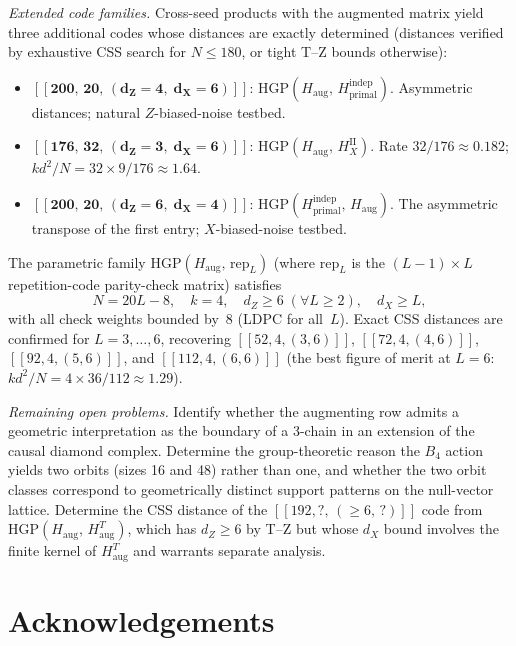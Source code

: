 \documentclass[12pt,a4paper]{article}
\theoremstyle{plain}
\theoremstyle{definition}
\theoremstyle{remark}
\begin{document}
\begin{description}[style=nextline]
\emph{Extended code families.}
Cross-seed products with the augmented matrix yield three additional
codes whose distances are exactly determined (distances verified by
exhaustive CSS search for $N\leq 180$, or tight T--Z bounds otherwise):
\begin{itemize}[noitemsep]
\item $\mathbf{[[200,\,20,\,(d_Z{=}4,\;d_X{=}6)]]}$:
  $\mathrm{HGP}(H_{\mathrm{aug}},\, H_{\mathrm{primal}}^{\mathrm{indep}})$.
  Asymmetric distances; natural $Z$-biased-noise testbed.
\item $\mathbf{[[176,\,32,\,(d_Z{=}3,\;d_X{=}6)]]}$:
  $\mathrm{HGP}(H_{\mathrm{aug}},\, H_X^{\mathrm{II}})$.
  Rate $32/176 \approx 0.182$; $k d^2/N = 32\times 9/176 \approx 1.64$.
\item $\mathbf{[[200,\,20,\,(d_Z{=}6,\;d_X{=}4)]]}$:
  $\mathrm{HGP}(H_{\mathrm{primal}}^{\mathrm{indep}},\, H_{\mathrm{aug}})$.
  The asymmetric transpose of the first entry; $X$-biased-noise testbed.
\end{itemize}
The parametric family $\mathrm{HGP}(H_{\mathrm{aug}},\,\mathrm{rep}_L)$
(where $\mathrm{rep}_L$ is the $(L{-}1)\times L$ repetition-code
parity-check matrix) satisfies
\[
  N = 20L-8, \quad k=4, \quad d_Z \geq 6 \;(\forall L\geq 2),
  \quad d_X \geq L,
\]
with all check weights bounded by~8 (LDPC for all~$L$).
Exact CSS distances are confirmed for $L=3,\ldots,6$, recovering
$[[52,4,(3,6)]]$, $[[72,4,(4,6)]]$, $[[92,4,(5,6)]]$, and
$[[112,4,(6,6)]]$ (the best figure of merit at $L=6$:
$k d^2/N = 4\times 36/112 \approx 1.29$).

\emph{Remaining open problems.}
Identify whether the augmenting row admits a geometric interpretation
as the boundary of a 3-chain in an extension of the causal diamond complex.
Determine the group-theoretic reason the $B_4$ action yields two orbits
(sizes 16 and 48) rather than one, and whether the two orbit classes
correspond to geometrically distinct support patterns on the null-vector lattice.
Determine the CSS distance of the $[[192,?,\,(\geq 6,\,?)]]$ code from
$\mathrm{HGP}(H_{\mathrm{aug}},\, H_{\mathrm{aug}}^T)$, which has
$d_Z \geq 6$ by T--Z but whose $d_X$ bound involves the finite
kernel of $H_{\mathrm{aug}}^T$ and warrants separate analysis.

\end{description}

\section*{Acknowledgements}
\end{document}
